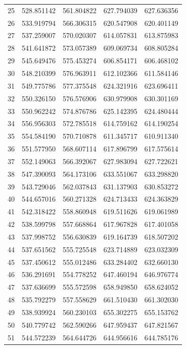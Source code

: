 \begin{table}
\begin{tabular}{rrrrr}
25 & 528.851142 & 561.804822 & 627.794039 & 627.636356 \\
26 & 533.919794 & 566.306315 & 620.547908 & 620.401149 \\
27 & 537.259007 & 570.020307 & 614.057831 & 613.875983 \\
28 & 541.641872 & 573.057389 & 609.069734 & 608.805284 \\
29 & 545.649476 & 575.453274 & 606.854171 & 606.468102 \\
30 & 548.210399 & 576.963911 & 612.102366 & 611.584146 \\
31 & 549.775786 & 577.375548 & 624.321916 & 623.696411 \\
32 & 550.326150 & 576.576906 & 630.979908 & 630.301169 \\
33 & 550.962242 & 574.876786 & 625.142395 & 624.480444 \\
34 & 556.956303 & 572.785518 & 614.759162 & 614.190254 \\
35 & 554.584190 & 570.710878 & 611.345717 & 610.911340 \\
36 & 551.577950 & 568.607114 & 617.896799 & 617.575614 \\
37 & 552.149063 & 566.392067 & 627.983094 & 627.722621 \\
38 & 547.390093 & 564.173106 & 633.551067 & 633.298820 \\
39 & 543.729046 & 562.037843 & 631.137903 & 630.853272 \\
40 & 544.657016 & 560.271328 & 624.713433 & 624.363829 \\
41 & 542.318422 & 558.860948 & 619.511626 & 619.061989 \\
42 & 538.599798 & 557.668864 & 617.967828 & 617.401058 \\
43 & 537.998752 & 556.630839 & 619.164739 & 618.507202 \\
44 & 537.651562 & 555.725548 & 623.714889 & 623.032309 \\
45 & 537.450612 & 555.012486 & 633.284402 & 632.660130 \\
46 & 536.291691 & 554.778252 & 647.460194 & 646.976774 \\
47 & 537.636699 & 555.572598 & 658.949850 & 658.624052 \\
48 & 535.792279 & 557.558629 & 661.510430 & 661.302030 \\
49 & 538.939924 & 560.230103 & 655.302275 & 655.153762 \\
50 & 540.779742 & 562.590266 & 647.959437 & 647.821567 \\
51 & 544.572239 & 564.644726 & 644.956616 & 644.785176 \\

\end{tabular}
\end{table}
